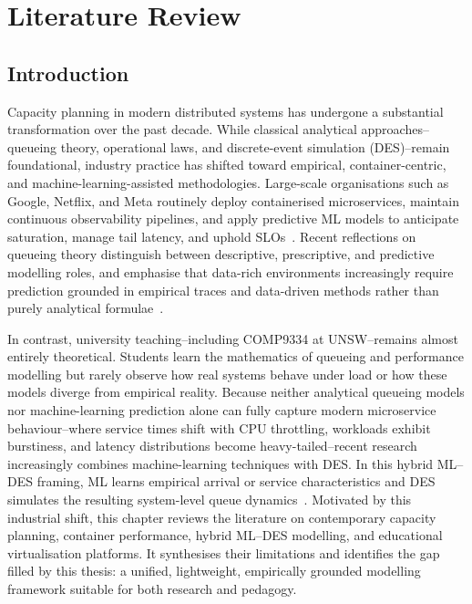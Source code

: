 ﻿\chapter{Literature Review}
\label{ch:litreview}

\section{Introduction}

Capacity planning in modern distributed systems has undergone a substantial transformation over the past decade. While classical analytical approaches--queueing theory, operational laws, and discrete-event simulation (DES)--remain foundational, industry practice has shifted toward empirical, container-centric, and machine-learning-assisted methodologies. Large-scale organisations such as Google, Netflix, and Meta routinely deploy containerised microservices, maintain continuous observability pipelines, and apply predictive ML models to anticipate saturation, manage tail latency, and uphold SLOs~\cite{Torres2020,Brewer2017}. Recent reflections on queueing theory distinguish between descriptive, prescriptive, and predictive modelling roles, and emphasise that data-rich environments increasingly require prediction grounded in empirical traces and data-driven methods rather than purely analytical formulae~\cite{Glynn2022QueueingFuture}.

In contrast, university teaching--including COMP9334 at UNSW--remains almost entirely theoretical. Students learn the mathematics of queueing and performance modelling but rarely observe how real systems behave under load or how these models diverge from empirical reality. Because neither analytical queueing models nor machine-learning prediction alone can fully capture modern microservice behaviour--where service times shift with CPU throttling, workloads exhibit burstiness, and latency distributions become heavy-tailed--recent research increasingly combines machine-learning techniques with DES. In this hybrid ML--DES framing, ML learns empirical arrival or service characteristics and DES simulates the resulting system-level queue dynamics~\cite{Greasley2020,Atalan2022HealthcareMLDES,Sarjoughian2023TransformDES}.
 Motivated by this industrial shift, this chapter reviews the literature on contemporary capacity planning, container performance, hybrid ML--DES modelling, and educational virtualisation platforms. It synthesises their limitations and identifies the gap filled by this thesis: a unified, lightweight, empirically grounded modelling framework suitable for both research and pedagogy.

